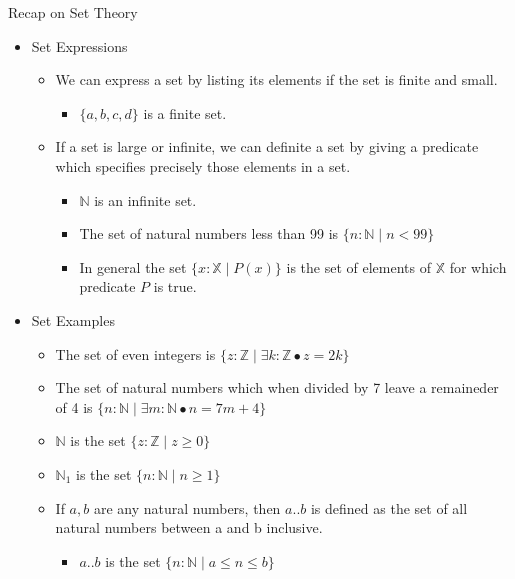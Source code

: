 \documentclass[aspectratio=169]{beamer}
\begin{document}
\begin{frame}{Recap on Set Theory}
    \begin{itemize}
        \item Set Expressions
        \begin{itemize}
            \item We can express a set by listing its elements if the set is finite and small.
            \begin{itemize}
                \item $\{a, b, c, d\}$ is a finite set.
            \end{itemize}
            \item If a set is large or infinite, we can definite a set by giving a predicate which specifies precisely those elements in a set.
            \begin{itemize}
                \item $\mathbb{N}$ is an infinite set.
                \item The set of natural numbers less than 99 is $\{n : \mathbb{N} \mid n < 99\}$
                \item In general the set $\{x : \mathbb{X} \mid P(x)\}$ is the set of elements of $\mathbb{X}$ for which predicate $P$ is true.
            \end{itemize}
        \end{itemize}
        \item Set Examples
        \begin{itemize}
            \item The set of even integers is $\{z : \mathbb{Z} \mid \exists k : \mathbb{Z} \bullet z = 2k\}$
            \item The set of natural numbers which when divided by 7 leave a remaineder of 4 is $\{n : \mathbb{N} \mid \exists m : \mathbb{N} \bullet n = 7m + 4 \}$
            \item $\mathbb{N}$ is the set $\{z : \mathbb{Z} \mid z \geq 0\}$
            \item $\mathbb{N}_{1}$ is the set $\{n : \mathbb{N} \mid n \geq 1\}$
            \item If $a, b$ are any natural numbers, then $a .. b$ is defined as the set of all natural numbers between a and b inclusive.
            \begin{itemize}
                \item $a..b$ is the set $\{n : \mathbb{N} \mid a \leq n \leq b\}$
            \end{itemize}
        \end{itemize}
    \end{itemize}
\end{frame}
\end{document}
